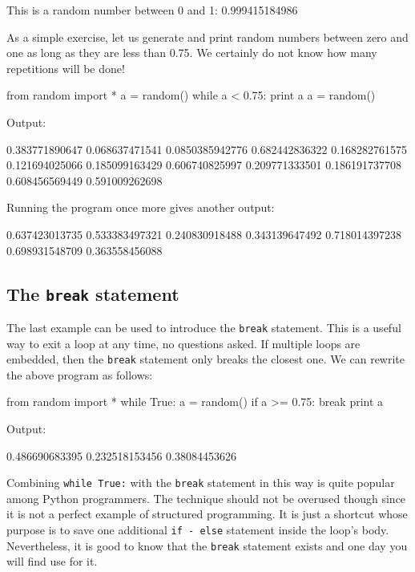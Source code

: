 \begin{greencode}
This is a random number between 0 and 1: 0.999415184986
\end{greencode}
As a simple exercise, let us generate and print random numbers between 
zero and one as long as they are less than 0.75. We certainly do not know 
how many repetitions will be done!

\begin{bluecode}
from random import *
a = random()
while a < 0.75:
    print a
    a = random()
\end{bluecode}
Output:

\begin{greencode}
0.383771890647
0.068637471541
0.0850385942776
0.682442836322
0.168282761575
0.121694025066
0.185099163429
0.606740825997
0.209771333501
0.186191737708
0.608456569449
0.591009262698
\end{greencode}
Running the program once more gives another output:

\begin{greencode}
0.637423013735
0.533383497321
0.240830918488
0.343139647492
0.718014397238
0.698931548709
0.363558456088
\end{greencode}

\subsection{The {\tt break} statement}

The last example can be used to 
introduce the {\tt break} statement. This is a useful way to exit a loop at any time,
no questions asked.
If multiple loops are embedded, then the {\tt break} statement only breaks the closest 
one. We can rewrite the above program as follows: 

\begin{bluecode}
from random import *
while True:
    a = random()
    if a >= 0.75: 
        break
    print a
\end{bluecode}
Output:

\begin{greencode}
0.486690683395
0.232518153456
0.38084453626
\end{greencode}
Combining {\tt while True:} with the {\tt break} statement in this way is 
quite popular among Python programmers. The technique should not be overused 
though since it is not a perfect example of structured programming. It is 
just a shortcut whose purpose is to save one additional {\tt if - else} statement
inside the loop's body. Nevertheless, it is good to know that the 
{\tt break} statement exists and one day you will find use for it.

